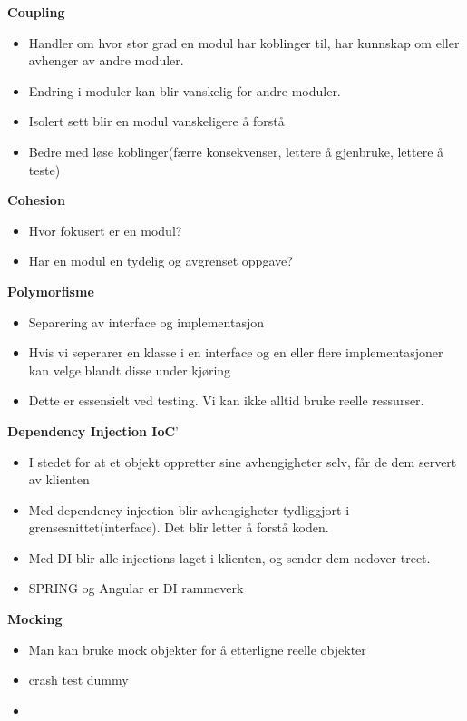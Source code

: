 \documentclass{article}
\begin{document}
\begin{flushleft}
        \textbf{Coupling}
        \begin{itemize}
            \item Handler om hvor stor grad en modul har koblinger til, har kunnskap om eller avhenger av andre moduler.
            \item Endring i moduler kan blir vanskelig for andre moduler.
            \item Isolert sett blir en modul vanskeligere å forstå
            \item Bedre med løse koblinger(færre konsekvenser, lettere å gjenbruke, lettere å teste)
        \end{itemize}

        \textbf{Cohesion}
        \begin{itemize}
            \item Hvor fokusert er en modul?
            \item Har en modul en tydelig og avgrenset oppgave? 
        \end{itemize}


        \textbf{Polymorfisme}
        \begin{itemize}
            \item Separering av interface og implementasjon
            \item Hvis vi seperarer en klasse i en interface og en eller flere implementasjoner kan velge blandt disse under kjøring
            \item Dette er essensielt ved testing. Vi kan ikke alltid bruke reelle ressurser.
        \end{itemize}

        \textbf{Dependency Injection IoC}'
        \begin{itemize}
            \item I stedet for at et objekt oppretter sine avhengigheter selv, får de dem servert av klienten
            \item Med dependency injection blir avhengigheter tydliggjort i grensesnittet(interface). Det blir letter å forstå koden.
            \item Med DI blir alle injections laget i klienten, og sender dem nedover treet. 
            \item SPRING og Angular er DI rammeverk
        \end{itemize}

        \textbf{Mocking}
        \begin{itemize}
            \item Man kan bruke mock objekter for å etterligne reelle objekter
            \item crash test dummy
            \item 
        \end{itemize}




    \end{flushleft}
\end{document}
